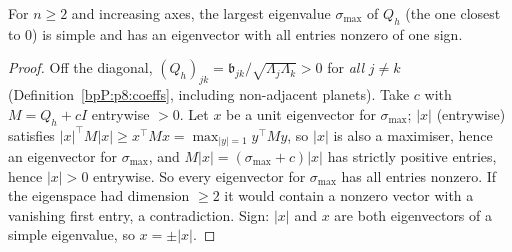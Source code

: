 \begin{lemma}\label{bpP:p9:top-simple}
For $n\ge2$ and increasing axes, the largest eigenvalue $\sigma_{\max}$ of $Q_h$ (the one closest to $0$) is simple and has an eigenvector with all entries nonzero of one sign.
\end{lemma}
\begin{proof}
\label{stepP:p9:ts-pos} Off the diagonal, $(Q_h)_{jk}=\mathfrak b_{jk}/\sqrt{\Lambda_j\Lambda_k}>0$ for \emph{all} $j\ne k$ (Definition~\ref{bpP:p8:coeffs}, including non-adjacent planets). Take $c$ with $M=Q_h+cI$ entrywise $>0$. Let $x$ be a unit eigenvector for $\sigma_{\max}$; $\lvert x\rvert$ (entrywise) satisfies $\lvert x\rvert^\top M\lvert x\rvert\ge x^\top Mx=\max_{\lvert y\rvert=1}y^\top My$, so $\lvert x\rvert$ is also a maximiser, hence an eigenvector for $\sigma_{\max}$, and $M\lvert x\rvert=(\sigma_{\max}+c)\lvert x\rvert$ has strictly positive entries, hence $\lvert x\rvert>0$ entrywise. So every eigenvector for $\sigma_{\max}$ has all entries nonzero. If the eigenspace had dimension $\ge2$ it would contain a nonzero vector with a vanishing first entry, a contradiction. Sign: $\lvert x\rvert$ and $x$ are both eigenvectors of a simple eigenvalue, so $x=\pm\lvert x\rvert$.
\end{proof}

